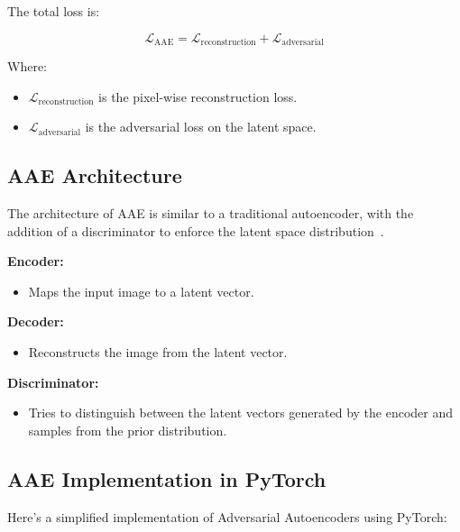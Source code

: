 The total loss is:

\[
\mathcal{L}_{\text{AAE}} = \mathcal{L}_{\text{reconstruction}} + \mathcal{L}_{\text{adversarial}}
\]

Where:
\begin{itemize}
    \item \( \mathcal{L}_{\text{reconstruction}} \) is the pixel-wise reconstruction loss.
    \item \( \mathcal{L}_{\text{adversarial}} \) is the adversarial loss on the latent space.
\end{itemize}

\subsection{AAE Architecture}
The architecture of AAE is similar to a traditional autoencoder, with the addition of a discriminator to enforce the latent space distribution~\cite{donahue2016adversarial}.

\textbf{Encoder:}
\begin{itemize}
    \item Maps the input image to a latent vector.
\end{itemize}

\textbf{Decoder:}
\begin{itemize}
    \item Reconstructs the image from the latent vector.
\end{itemize}

\textbf{Discriminator:}
\begin{itemize}
    \item Tries to distinguish between the latent vectors generated by the encoder and samples from the prior distribution.
\end{itemize}

\subsection{AAE Implementation in PyTorch}
Here's a simplified implementation of Adversarial Autoencoders using PyTorch:

